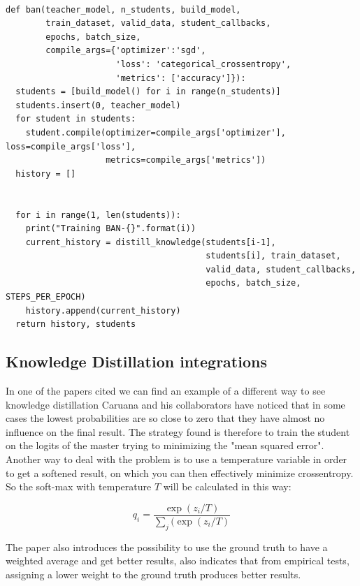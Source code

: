 \begin{lstlisting}

def ban(teacher_model, n_students, build_model, 
        train_dataset, valid_data, student_callbacks, 
        epochs, batch_size, 
        compile_args={'optimizer':'sgd', 
                      'loss': 'categorical_crossentropy', 
                      'metrics': ['accuracy']}):
  students = [build_model() for i in range(n_students)]
  students.insert(0, teacher_model)
  for student in students:
    student.compile(optimizer=compile_args['optimizer'], loss=compile_args['loss'], 
                    metrics=compile_args['metrics'])
  history = []


  for i in range(1, len(students)):
    print("Training BAN-{}".format(i))
    current_history = distill_knowledge(students[i-1], 
                                        students[i], train_dataset, 
                                        valid_data, student_callbacks, 
                                        epochs, batch_size, STEPS_PER_EPOCH)   
    history.append(current_history)
  return history, students

\end{lstlisting}

\subsection{Knowledge Distillation integrations}
In one of the papers cited we can find an example of a different way to see knowledge distillation\cite{kd} Caruana and his collaborators have noticed that in some cases the lowest probabilities are so close to zero that they have almost no influence on the final result\cite{conf}. The strategy found is therefore to train the student on the logits of the master trying to minimizing the "mean squared error".\\
Another way to deal with the problem is to use a temperature variable in order to get a softened result, on which you can then effectively minimize crossentropy. So the soft-max with temperature $T$ will be calculated in this way:

\begin{equation}
q_i = \frac{\exp(z_i/T)}{\sum_j(\exp(z_i/T)}
\end{equation}

The paper\cite{kd} also introduces the possibility to use the ground truth to have a weighted average and get better results, also indicates that from empirical tests, assigning a lower weight to the ground truth produces better results.
\newpage
